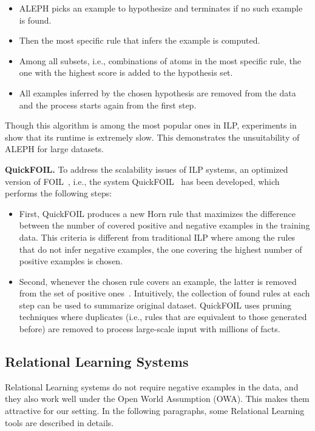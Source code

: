 \begin{itemize}
\item ALEPH picks an example to hypothesize and terminates if no such example is found.
\item Then the most specific rule that infers the example is computed.
\item Among all subsets, i.e., combinations of atoms in the most specific rule, the one with the highest score is added to the hypothesis set.
\item All examples inferred by the chosen hypothesis are removed from the data and the process starts again from the first step.
\end{itemize}

Though this algorithm is among the most popular ones in ILP, experiments in~\cite{ref10} show that its runtime is extremely slow. This demonstrates the unsuitability of ALEPH for large datasets.

\textbf{QuickFOIL.} To address the scalability issues of ILP systems, an optimized version of FOIL~\cite{ref36}, i.e., the system QuickFOIL~\cite{ref45} has been developed, which performs the following steps:

\begin{itemize}
\item First, QuickFOIL produces a new Horn rule that maximizes the difference between the number of covered positive and negative examples in the training data. This criteria is different from traditional ILP where among the rules that do not infer negative examples, the one covering the highest number of positive examples is chosen.
\item Second, whenever the chosen rule covers an example, the latter is removed from the set of positive ones~\cite{ref10}. Intuitively, the collection of found rules at each step can be used to summarize original dataset. QuickFOIL uses pruning techniques where duplicates (i.e., rules that are equivalent to those generated before) are removed to process large-scale input with millions of facts.

\end{itemize}

\subsection{Relational Learning Systems}

Relational Learning systems do not require negative examples in the data, and they also work well under the Open World Assumption (OWA). This makes them attractive for our setting. In the following paragraphs, some Relational Learning tools are described in details.

